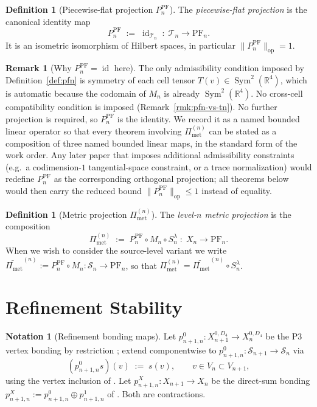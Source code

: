 \documentclass[11pt, a4paper]{amsart}
\theoremstyle{definition}
\newtheorem{definition}[theorem]{Definition}
\newtheorem{remark}[theorem]{Remark}
\newtheorem{notation}[theorem]{Notation}
\newcommand{\R}{\mathbb{R}}
\newcommand{\id}{\operatorname{id}}
\newcommand{\op}{\operatorname{op}}
\newcommand{\Sym}{\operatorname{Sym}}
\newcommand{\Met}{\mathrm{met}}
\newcommand{\PF}{\mathrm{PF}}
\newcommand{\Pimet}{\Pi_{\Met}}
\begin{document}
\begin{definition}[Piecewise-flat projection $P_n^\PF$]
\label{def:pn-pf}
The \emph{piecewise-flat projection} is the canonical identity
map
\[
  P_n^\PF \;:=\; \id_{\mathcal T_n}
    \;\colon\; \mathcal T_n \to \PF_n.
\]
It is an isometric isomorphism of Hilbert spaces, in particular
$\|P_n^\PF\|_\op = 1$.
\end{definition}

\begin{remark}[Why $P_n^\PF = \id$ here]
\label{rmk:pnpf-identity}
The only admissibility condition imposed by
Definition~\ref{def:pfn} is symmetry of each cell tensor
$T(v) \in \Sym^2(\R^4)$, which is automatic because the codomain
of $M_n$ is already $\Sym^2(\R^4)$. No cross-cell compatibility
condition is imposed (Remark~\ref{rmk:pfn-vs-tn}). No further
projection is required, so $P_n^\PF$ is the identity. We record it as a named bounded
linear operator so that every theorem involving $\Pimet^{(n)}$
can be stated as a composition of three named bounded linear
maps, in the standard form of the work order. Any later paper
that imposes additional admissibility constraints (e.g.\ a
codimension-$1$ tangential-space constraint, or a trace
normalization) would redefine $P_n^\PF$ as the corresponding
orthogonal projection; all theorems below would then carry the
reduced bound $\|P_n^\PF\|_\op \leq 1$ instead of equality.
\end{remark}

\begin{definition}[Metric projection $\Pimet^{(n)}$]
\label{def:pimet}
The \emph{level-$n$ metric projection} is the composition
\[
  \Pimet^{(n)} \;:=\; P_n^\PF \circ M_n \circ S_n^\lambda
    \;\colon\; X_n \to \PF_n.
\]
When we wish to consider the source-level variant we write
$\widetilde{\Pimet}^{(n)} := P_n^\PF \circ M_n \colon
\mathcal S_n \to \PF_n$, so that $\Pimet^{(n)} =
\widetilde{\Pimet}^{(n)} \circ S_n^\lambda$.
\end{definition}

\section{Refinement Stability}
\label{sec:refinement}

\begin{notation}[Refinement bonding maps]
\label{not:bonding}
Let $p_{n+1, n}^0 \colon X_{n+1}^{0, D_4} \to X_n^{0, D_4}$ be
the P3 vertex bonding by restriction
\cite[Def.~5.1]{RefinementSpaces}; extend componentwise to
$p_{n+1, n}^0 \colon \mathcal S_{n+1} \to \mathcal S_n$ via
\[
  (p_{n+1, n}^0 s)(v) \;:=\; s(v), \qquad v \in V_n \subset V_{n+1},
\]
using the vertex inclusion of \cite[Rmk.~2.3]{RefinementSpaces}.
Let $p_{n+1, n}^X \colon X_{n+1} \to X_n$ be the direct-sum
bonding $p_{n+1, n}^X := p_{n+1, n}^0 \oplus p_{n+1, n}^1$ of
\cite[Thm.~5.3]{RefinementSpaces}. Both are contractions.
\end{notation}
\end{document}
